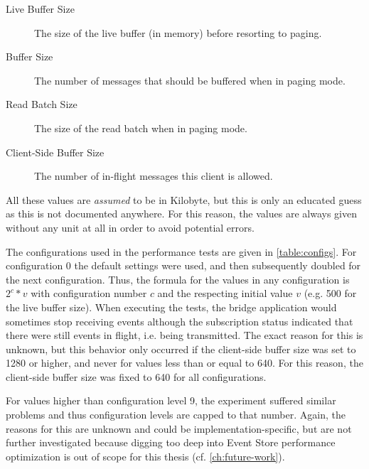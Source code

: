 \begin{description}
\item[Live Buffer Size] The size of the live buffer (in memory) before resorting to paging.
\item[Buffer Size] The number of messages that should be buffered when in paging mode.
\item[Read Batch Size] The size of the read batch when in paging mode.
\item[Client-Side Buffer Size] The number of in-flight messages this client is allowed.
\end{description}

All these values are \emph{assumed} to be in Kilobyte, but this is only an educated guess as this is not documented anywhere.
For this reason, the values are always given without any unit at all in order to avoid potential errors.

The configurations used in the performance tests are given in \cref{table:configs}.
For configuration 0 the default settings were used, and then subsequently doubled for the next configuration.
Thus, the formula for the values in any configuration is $ 2^c * v $ with configuration number $c$ and the respecting initial value $v$ (e.g. 500 for the live buffer size).
When executing the tests, the bridge application would sometimes stop receiving events although the subscription status indicated that there were still events in flight, i.e. being transmitted.
The exact reason for this is unknown, but this behavior only occurred if the client-side buffer size was set to 1280 or higher, and never for values less than or equal to 640.
For this reason, the client-side buffer size was fixed to 640 for all configurations.

For values higher than configuration level 9, the experiment suffered similar problems and thus configuration levels are capped to that number.
Again, the reasons for this are unknown and could be implementation-specific, but are not further investigated because digging too deep into Event Store performance optimization is out of scope for this thesis (cf. \cref{ch:future-work}).

